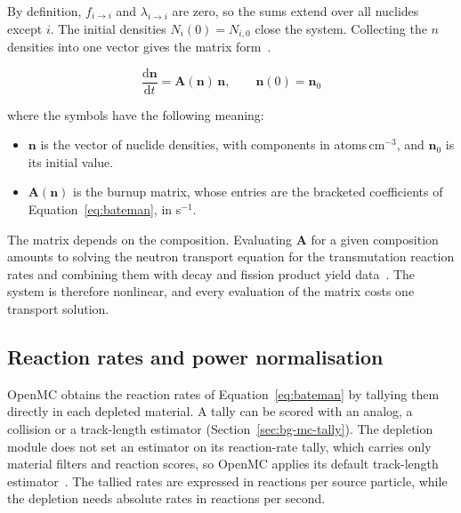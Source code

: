 By definition, $f_{i\rightarrow i}$ and $\lambda_{i\rightarrow i}$ are
zero, so the sums extend over all nuclides except $i$. The initial
densities $N_i(0) = N_{i,0}$ close the system. Collecting the $n$
densities into one vector gives the matrix
form~\cite{romano_2021_depletion}.

\begin{equation}
\frac{\mathrm{d}\mathbf{n}}{\mathrm{d}t} =
\mathbf{A}(\mathbf{n})\,\mathbf{n},
\qquad \mathbf{n}(0) = \mathbf{n}_0
\label{eq:bateman-matrix}
\end{equation}

\noindent where the symbols have the following meaning:

\begin{itemize}
  \item $\mathbf{n}$ is the vector of nuclide densities, with components
        in atoms\,cm$^{-3}$, and $\mathbf{n}_0$ is its initial value.

  \item $\mathbf{A}(\mathbf{n})$ is the burnup matrix, whose entries are
        the bracketed coefficients of Equation~\eqref{eq:bateman}, in
        s$^{-1}$.
\end{itemize}

The matrix depends on the composition. Evaluating $\mathbf{A}$ for a
given composition amounts to solving the neutron transport equation for
the transmutation reaction rates and combining them with decay and
fission product yield data~\cite{romano_2021_depletion}. The system is
therefore nonlinear, and every evaluation of the matrix costs one
transport solution.

\subsection{Reaction rates and power normalisation}
\label{sec:bg-dep-norm}

OpenMC obtains the reaction rates of Equation~\eqref{eq:bateman} by
tallying them directly in each depleted material. A tally can be scored
with an analog, a collision or a track-length estimator
(Section~\ref{sec:bg-mc-tally}). The depletion module does not set an
estimator on its reaction-rate tally, which carries only material
filters and reaction scores, so OpenMC applies its default track-length
estimator~\cite{romano_2021_depletion,openmc_docs}. The tallied rates are expressed in reactions per source particle, while
the depletion needs absolute rates in reactions per second.

